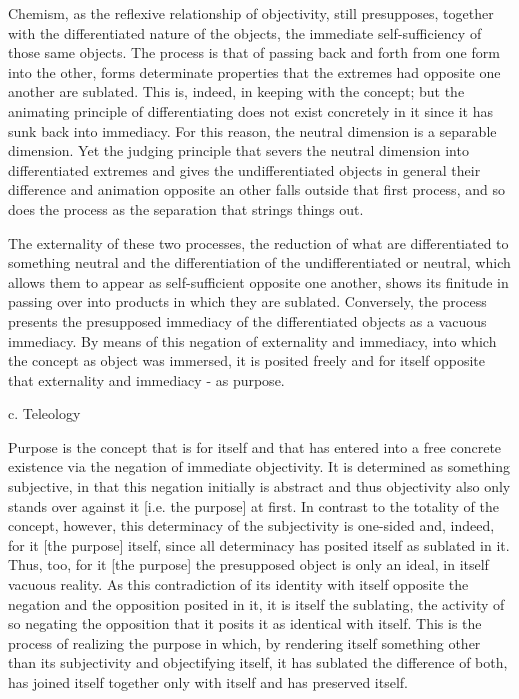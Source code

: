 Chemism, as the reflexive relationship of objectivity, still presupposes,
together with the differentiated nature of the objects,
the immediate self-sufficiency of those same objects.
The process is that of passing back and forth from one form into the other,
forms determinate properties that the extremes had opposite one another are sublated.
This is, indeed, in keeping with the concept;
but the animating principle of differentiating does not exist
concretely in it since it has sunk back into immediacy.
For this reason, the neutral dimension is a separable dimension.
Yet the judging principle that severs the neutral dimension into
differentiated extremes and gives the undifferentiated objects in general
their difference and animation opposite an other falls outside that first process,
and so does the process as the separation that strings things out.

The externality of these two processes,
the reduction of what are differentiated to something neutral and
the differentiation of the undifferentiated or neutral,
which allows them to appear as self-sufficient opposite one another,
shows its finitude in passing over into products in which they are sublated.
Conversely, the process presents the presupposed immediacy
of the differentiated objects as a vacuous immediacy.
By means of this negation of externality and immediacy,
into which the concept as object was immersed,
it is posited freely and for itself opposite
that externality and immediacy - as purpose.

c. Teleology

Purpose is the concept that is for itself and that has entered into
a free concrete existence via the negation of immediate objectivity.
It is determined as something subjective, in that this negation
initially is abstract and thus objectivity also only stands
over against it [i.e. the purpose] at first.
In contrast to the totality of the concept, however,
this determinacy of the subjectivity is one-sided and, indeed,
for it [the purpose] itself, since all determinacy has posited
itself as sublated in it.
Thus, too, for it [the purpose] the presupposed object is
only an ideal, in itself vacuous reality.
As this contradiction of its identity with itself opposite the negation and the
opposition posited in it, it is itself the sublating, the activity of so negating
the opposition that it posits it as identical with itself.
This is the process of realizing the purpose in which,
by rendering itself something other than its subjectivity and
objectifying itself, it has sublated the difference of both,
has joined itself together only with itself and has preserved itself.

